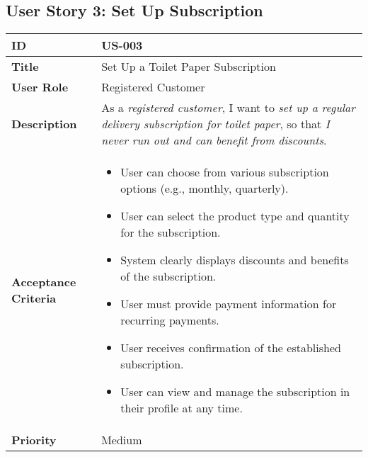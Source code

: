 \documentclass[a4paper,11pt]{article}
\begin{document}
\subsection{User Story 3: Set Up Subscription}
\begin{tabularx}{\textwidth}{|l|X|}
\hline
\textbf{ID} & US-003 \\
\hline
\textbf{Title} & Set Up a Toilet Paper Subscription \\
\hline
\textbf{User Role} & Registered Customer \\
\hline
\textbf{Description} & As a \textit{registered customer}, I want to \textit{set up a regular delivery subscription for toilet paper}, so that \textit{I never run out and can benefit from discounts}. \\
\hline
\textbf{Acceptance Criteria} &
\begin{itemize}[noitemsep, topsep=0pt]
    \item User can choose from various subscription options (e.g., monthly, quarterly).
    \item User can select the product type and quantity for the subscription.
    \item System clearly displays discounts and benefits of the subscription.
    \item User must provide payment information for recurring payments.
    \item User receives confirmation of the established subscription.
    \item User can view and manage the subscription in their profile at any time.
\end{itemize} \\
\hline
\textbf{Priority} & Medium \\
\hline
\end{tabularx}
\end{document}
